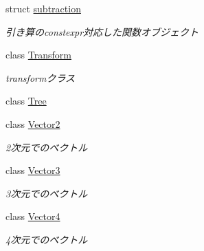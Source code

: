 \begin{DoxyCompactItemize}
struct \mbox{\hyperlink{structsaki_1_1subtraction}{subtraction}}
\begin{DoxyCompactList}\small\item\em 引き算のconstexpr対応した関数オブジェクト \end{DoxyCompactList}\item 
class \mbox{\hyperlink{classsaki_1_1_transform}{Transform}}
\begin{DoxyCompactList}\small\item\em transformクラス \end{DoxyCompactList}\item 
class \mbox{\hyperlink{classsaki_1_1_tree}{Tree}}
\item 
class \mbox{\hyperlink{classsaki_1_1_vector2}{Vector2}}
\begin{DoxyCompactList}\small\item\em 2次元でのベクトル \end{DoxyCompactList}\item 
class \mbox{\hyperlink{classsaki_1_1_vector3}{Vector3}}
\begin{DoxyCompactList}\small\item\em 3次元でのベクトル \end{DoxyCompactList}\item 
class \mbox{\hyperlink{classsaki_1_1_vector4}{Vector4}}
\begin{DoxyCompactList}\small\item\em 4次元でのベクトル \end{DoxyCompactList}\end{DoxyCompactItemize}
